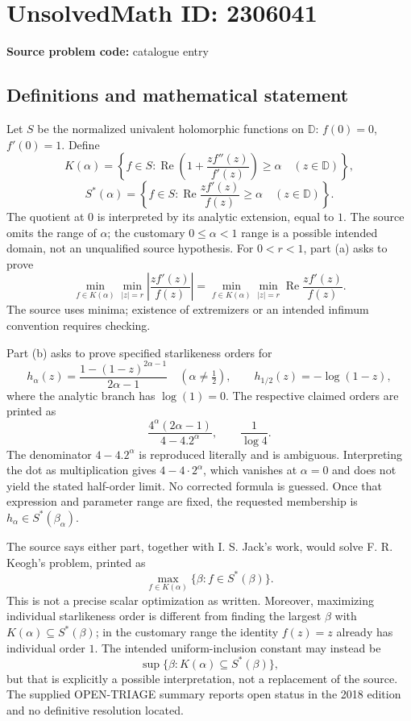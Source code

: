 \documentclass[11pt]{article}
\begin{document}
\section*{UnsolvedMath ID: 2306041}
\textbf{Source problem code:} catalogue entry
\subsection{Definitions and mathematical statement}
Let \(S\) be the normalized univalent holomorphic functions on \(\mathbb D\): \(f(0)=0\), \(f'(0)=1\). Define
\[
K(\alpha)=\left\{f\in S:\operatorname{Re}\left(1+\frac{zf''(z)}{f'(z)}\right)\ge\alpha\quad(z\in\mathbb D)\right\},
\]
\[
S^*(\alpha)=\left\{f\in S:\operatorname{Re}\frac{zf'(z)}{f(z)}\ge\alpha\quad(z\in\mathbb D)\right\}.
\]
The quotient at \(0\) is interpreted by its analytic extension, equal to \(1\). The source omits the range of \(\alpha\); the customary \(0\le\alpha<1\) range is a possible intended domain, not an unqualified source hypothesis. For \(0<r<1\), part (a) asks to prove
\[
\min_{f\in K(\alpha)}\min_{|z|=r}\left|\frac{zf'(z)}{f(z)}\right|
=\min_{f\in K(\alpha)}\min_{|z|=r}\operatorname{Re}\frac{zf'(z)}{f(z)}.
\]
The source uses minima; existence of extremizers or an intended infimum convention requires checking.

Part (b) asks to prove specified starlikeness orders for
\[
h_\alpha(z)=\frac{1-(1-z)^{2\alpha-1}}{2\alpha-1}\quad(\alpha\ne\tfrac12),
\qquad h_{1/2}(z)=-\log(1-z),
\]
where the analytic branch has \(\log(1)=0\). The respective claimed orders are printed as
\[
\frac{4^\alpha(2\alpha-1)}{4-4.2^\alpha},\qquad \frac1{\log4}.
\]
The denominator \(4-4.2^\alpha\) is reproduced literally and is ambiguous. Interpreting the dot as multiplication gives \(4-4\cdot2^\alpha\), which vanishes at \(\alpha=0\) and does not yield the stated half-order limit. No corrected formula is guessed. Once that expression and parameter range are fixed, the requested membership is \(h_\alpha\in S^*(\beta_\alpha)\).

The source says either part, together with I. S. Jack's work, would solve F. R. Keogh's problem, printed as
\[
\max_{f\in K(\alpha)}\{\beta:f\in S^*(\beta)\}.
\]
This is not a precise scalar optimization as written. Moreover, maximizing individual starlikeness order is different from finding the largest \(\beta\) with \(K(\alpha)\subseteq S^*(\beta)\); in the customary range the identity \(f(z)=z\) already has individual order \(1\). The intended uniform-inclusion constant may instead be
\[
\sup\{\beta:K(\alpha)\subseteq S^*(\beta)\},
\]
but that is explicitly a possible interpretation, not a replacement of the source. The supplied OPEN-TRIAGE summary reports open status in the 2018 edition and no definitive resolution located.
\end{document}
